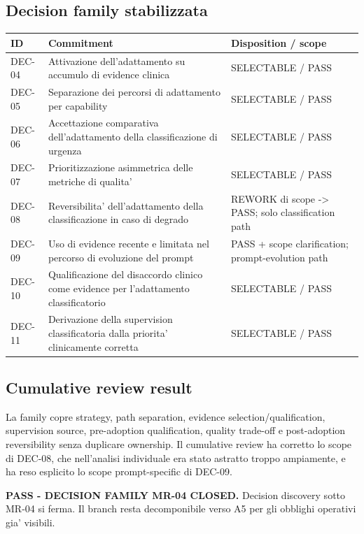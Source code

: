 \documentclass[11pt,a4paper]{article}
\begin{document}
\subsection{Decision family stabilizzata}
\begin{longtable}{L{18mm}L{55mm}L{70mm}}
\toprule
\textbf{ID} & \textbf{Commitment} & \textbf{Disposition / scope} \\
\midrule\endhead
DEC-04 & Attivazione dell'adattamento su accumulo di evidence clinica & SELECTABLE / PASS \\
DEC-05 & Separazione dei percorsi di adattamento per capability & SELECTABLE / PASS \\
DEC-06 & Accettazione comparativa dell'adattamento della classificazione di urgenza & SELECTABLE / PASS \\
DEC-07 & Prioritizzazione asimmetrica delle metriche di qualita' & SELECTABLE / PASS \\
DEC-08 & Reversibilita' dell'adattamento della classificazione in caso di degrado & REWORK di scope -> PASS; solo classification path \\
DEC-09 & Uso di evidence recente e limitata nel percorso di evoluzione del prompt & PASS + scope clarification; prompt-evolution path \\
DEC-10 & Qualificazione del disaccordo clinico come evidence per l'adattamento classificatorio & SELECTABLE / PASS \\
DEC-11 & Derivazione della supervision classificatoria dalla priorita' clinicamente corretta & SELECTABLE / PASS \\
\bottomrule
\end{longtable}

\subsection{Cumulative review result}
La family copre strategy, path separation, evidence selection/qualification, supervision source, pre-adoption qualification, quality trade-off e post-adoption reversibility senza duplicare ownership. Il cumulative review ha corretto lo scope di DEC-08, che nell'analisi individuale era stato astratto troppo ampiamente, e ha reso esplicito lo scope prompt-specific di DEC-09.

\begin{ddtacore}[title={D2 cumulative disposition - MR-04}]
\textbf{PASS - DECISION FAMILY MR-04 CLOSED.} Decision discovery sotto MR-04 si ferma. Il branch resta decomponibile verso A5 per gli obblighi operativi gia' visibili.
\end{ddtacore}
\end{document}
